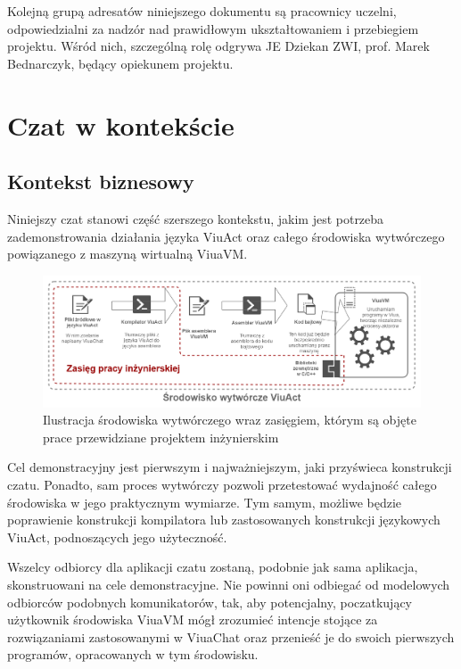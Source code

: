 Kolejną grupą adresatów niniejszego dokumentu są pracownicy uczelni, odpowiedzialni za nadzór nad prawidłowym ukształtowaniem i przebiegiem projektu. Wśród nich, szczególną rolę odgrywa JE Dziekan ZWI, prof. Marek Bednarczyk, będący opiekunem projektu.

\section{Czat w kontekście}

\subsection{Kontekst biznesowy}

Niniejszy czat stanowi część szerszego kontekstu, jakim jest potrzeba zademonstrowania działania języka ViuAct oraz całego środowiska wytwórczego powiązanego z maszyną wirtualną ViuaVM.

\begin{figure}[h]
	\centering
	\includegraphics[width=\textwidth]{chat/fig/viuavm-env}
	\caption{Ilustracja środowiska wytwórczego wraz zasięgiem, którym są objęte prace przewidziane projektem inżynierskim}
\end{figure}

Cel demonstracyjny jest pierwszym i najważniejszym, jaki przyświeca konstrukcji czatu. Ponadto, sam proces wytwórczy pozwoli
przetestować wydajność całego środowiska w jego praktycznym wymiarze. Tym samym, możliwe będzie poprawienie konstrukcji kompilatora 
lub zastosowanych konstrukcji językowych ViuAct, podnoszących jego użyteczność.

Wszelcy odbiorcy dla aplikacji czatu zostaną, podobnie jak sama aplikacja, skonstruowani na cele demonstracyjne. Nie powinni oni
odbiegać od modelowych odbiorców podobnych komunikatorów, tak, aby potencjalny, poczatkujący użytkownik środowiska ViuaVM mógł
zrozumieć intencje stojące za rozwiązaniami zastosowanymi w ViuaChat oraz przenieść je do swoich pierwszych programów, opracowanych
w tym środowisku.

